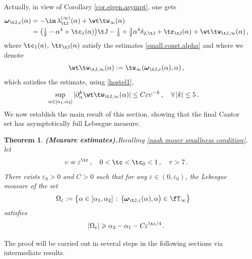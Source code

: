 \documentclass[a4paper,reqno,10pt]{article}
\newtheorem{theo}{Theorem}[section]
\newcommand{\pa}{\partial}
\newcommand{\bomega}{{\boldsymbol{\omega}}}
\begin{document}
Actually,  in view of Corollary \ref{cor.eigen.asympt}, one gets
		\begin{align}
			\bomega_{\tJ,\varepsilon}(\alpha) & = -\im\,\lambda_{\tJ}^{(\infty)}(\alpha) + \wt\tw_{\infty}(\alpha) \\
			&=   \big(\tfrac{1}{2} -\alpha^4 +  \tc_{1}(\alpha) \big)\tJ - \tfrac12 +\tfrac32 \alpha^4 \delta_{2,\tJ}   + \tr_{\tJ}(\alpha) + \wt\tw_{\tJ,\infty}(\alpha)\,,\label{ME.1} 
		\end{align}
        where $\tc_{1}(a)$, $\tr_{\tJ}(\alpha)$ satisfy the estimates \eqref{small.const.alpha} and where we denote
	\begin{equation}
		\wt\tw_{\tJ,\infty}(\alpha):= \tw_{\infty}(\bomega_{\tJ,\varepsilon}(\alpha),\alpha) \,, 
	\end{equation}
	which satisfies the estimate, using \eqref{hostel1},
	\begin{align}
		&\sup_{\alpha\in[\alpha_{1},\alpha_{2}]}|\pa_{\alpha}^{k}\wt\tw_{\tJ,\infty}(\alpha)| \leq C \varepsilon \upsilon^{-k} \,, \quad \forall \, |k|\leq 5 \,.\label{ME.2} 
	\end{align}
We now establish the main result of this section, showing that the final Cantor set has asymptotically full Lebesgue measure.
\begin{theo}{\bf (Measure estimates).}\label{meas.est.thm}
	Recalling \eqref{nash moser smallness condition}, let
	\begin{equation}\label{param.meas.est}
		\upsilon= \varepsilon^{\tc} \,, \quad 0<\tc<\tc_0 <1\,, \quad \tau > 7 \,.
	\end{equation}
	There exists $\varepsilon_0>0$ and $C>0$ such that for any  $\varepsilon\in (0,\varepsilon_{0})$, the Lebesgue measure of the set
    \begin{align}\label{set.to.measure}
        \Omega_{\varepsilon} &:= \big\{  \alpha\in[\alpha_{1},\alpha_{2}] \, : \, \big( \bomega_{\tJ,\varepsilon}(\alpha),\alpha \big) \in \fT_{\infty} \big\} 
    \end{align}
	satisfies $$|\Omega_{\varepsilon}|\geqslant  \alpha_{2}-\alpha_{1}- C\varepsilon^{\tc/4}\,.
    $$
\end{theo}
The proof will be carried out in several steps in the following sections via intermediate results.
\end{document}
